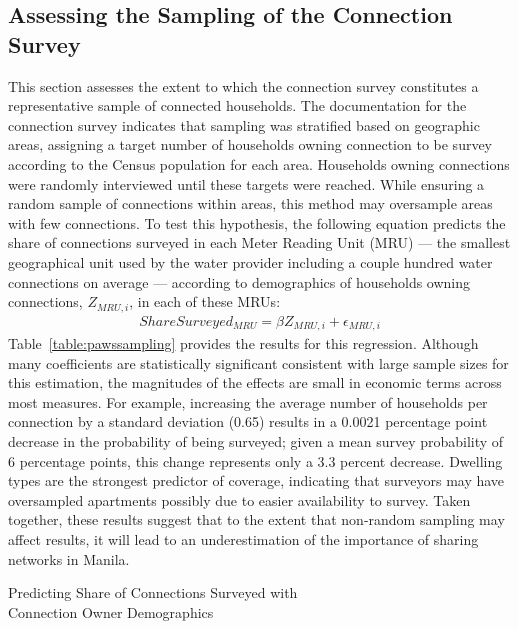 \documentclass[12pt]{article}
\begin{document}
\begin{appendices}
\section{Assessing the Sampling of the Connection Survey}\label{appendix:pawssampling}

This section assesses the extent to which the connection survey constitutes a representative sample of connected households.  The documentation for the connection survey indicates that sampling was stratified based on geographic areas, assigning a target number of households owning connection to be survey according to the Census population for each area.  Households owning connections were randomly interviewed until these targets were reached.  While ensuring a random sample of connections within areas, this method may oversample areas with few connections.  To test this hypothesis, the following equation predicts the share of connections surveyed in each Meter Reading Unit (MRU) --- the smallest geographical unit used by the water provider including a couple hundred water connections on average --- according to demographics of households owning connections, $Z_{MRU,i}$, in each of these MRUs:
\begin{align*}
ShareSurveyed_{MRU} = \beta Z_{MRU,i} + \epsilon_{MRU,i}
\end{align*}
Table~\ref{table:pawssampling} provides the results for this regression.  Although many coefficients are statistically significant consistent with large sample sizes for this estimation, the magnitudes of the effects are small in economic terms across most measures.  For example, increasing the average number of households per connection by a standard deviation (0.65) results in a 0.0021 percentage point decrease in the probability of being surveyed; given a mean survey probability of 6 percentage points, this change represents only a 3.3 percent decrease.  Dwelling types are the strongest predictor of coverage, indicating that surveyors may have oversampled apartments possibly due to easier availability to survey.  Taken together, these results suggest that to the extent that non-random sampling may affect results, it will lead to an underestimation of the importance of sharing networks in Manila.

\begin{table}
\centering
\caption{ Predicting Share of Connections Surveyed with \\ Connection Owner Demographics }\label{table:pawssampling}

\end{table}





\end{appendices}
\end{document}
